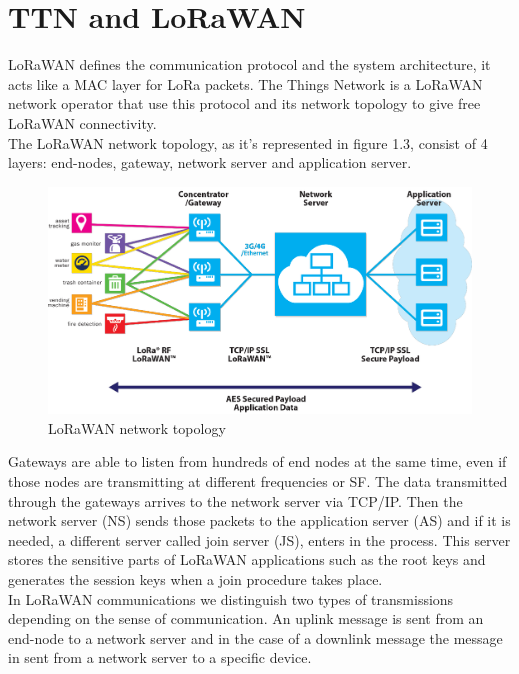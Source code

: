 \section{TTN and LoRaWAN}
\label{sec:f-ttnandlora}
LoRaWAN defines the communication protocol and the system
architecture, it acts like a MAC layer for LoRa packets. The Things
Network is a LoRaWAN network operator that use this protocol and its
network topology to give free LoRaWAN connectivity. \\
The LoRaWAN network topology, as it's represented in figure 1.3,
consist of 4 layers: end-nodes, gateway, network server and application
server.
\begin{figure}[htbp]
\includegraphics[width=\linewidth]{ttnarch.png}
\caption{LoRaWAN network topology}
\end{figure}
Gateways are able to listen from hundreds of end nodes at the same
time, even if those nodes are transmitting at different frequencies or SF.
The data transmitted through the gateways arrives to the network server
via TCP/IP. Then the network server (NS) sends those packets to the
application server (AS) and if it is needed, a different server called join
server (JS), enters in the process. This server stores the sensitive parts
of LoRaWAN applications such as the root keys and generates the
session keys when a join procedure takes place.\\
In LoRaWAN communications we distinguish two types of transmissions
depending on the sense of communication. An uplink message is sent
from an end-node to a network server and in the case of a downlink
message the message in sent from a network server to a specific device.

